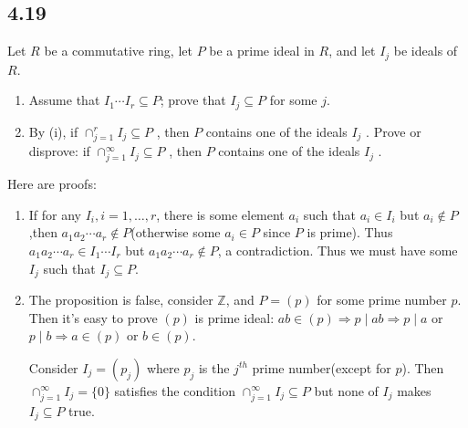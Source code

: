 \documentclass[a4paper, pdf, 12pt]{article}
\makeatletter
\renewenvironment{proof}[1][\proofname]{\par
  \pushQED{\qed}%
  \normalfont \topsep6\p@\@plus6\p@\relax
  \trivlist
  \item[%
    \hskip\labelsep
    \normalfont\bfseries %
    #1%
    \@addpunct{.}%
  ]\ignorespaces
}{%
  \popQED\endtrivlist\@endpefalse
}
\let\qed\relax %
\DeclareRobustCommand{\qed}{%
  \ifmmode \mathqed
  \else
    \leavevmode\unskip\penalty\@M\hbox{}\nobreak\hspace{.5em minus .1em}%
    \hbox{\qedsymbol}%
  \fi
}
\makeatother
\begin{document}
\subsection*{4.19}
Let $R$ be a commutative ring, let $P$ be a prime ideal in $R$, and let $I_j$ be ideals 
of $R$.
\begin{enumerate} [leftmargin=0.6cm,itemindent=.2cm,labelwidth=\itemindent,labelsep=0.2cm,align=right,label=(\roman*)]
\item Assume that $I_1\cdots I_r \subseteq P$; prove that $I_j \subseteq P$ for some $j$.
\item By (i), if $\cap_{j=1}^{r}I_j\subseteq P$ , then $P$ contains one of the ideals $I_j$ . Prove or disprove:
if $\cap_{j=1}^{\infty}I_j\subseteq P$ , then $P$ contains one of the ideals $I_j$ .
\end{enumerate}

\begin{proof}
  Here are proofs:
\begin{enumerate} [leftmargin=0.6cm,itemindent=.2cm,labelwidth=\itemindent,labelsep=0.2cm,align=right,label=(\roman*)]
  \item If for any $I_{i}, i=1,\ldots, r$, there is some element $a_{i}$ such that $a_{i}\in I_{i}$ but $a_{i}\notin P$
  ,then $a_1a_2\cdots a_{r}\notin P$(otherwise some $a_{i}\in P$ since $P$ is prime). Thus 
  $a_1a_2\cdots a_{r}\in I_{1}\cdots I_{r}$ but $a_1a_2\cdots a_{r}\notin P$, a contradiction. Thus we must 
  have some $I_{j}$ such that $I_{j}\subseteq P$.
  \item The proposition is false, consider $\mathbb{Z}$, and $P = (p)$ for some prime number $p$. Then it's 
  easy to prove $(p)$ is prime ideal: $ab\in (p)\Rightarrow p\mid ab\Rightarrow p\mid a$ or $p\mid b\Rightarrow a\in (p)$
  or $b\in (p)$.

  Consider $I_j = (p_j)$ where $p_{j}$ is the $j^{th}$ prime number(except for $p$). Then $\cap_{j=1}^{\infty}I_j=\{0\}$ satisfies the 
  condition $\cap_{j=1}^{\infty}I_{j}\subseteq P$ but none of $I_{j}$ makes $I_{j}\subseteq P$ true.
\end{enumerate}
\end{proof}
\end{document}
